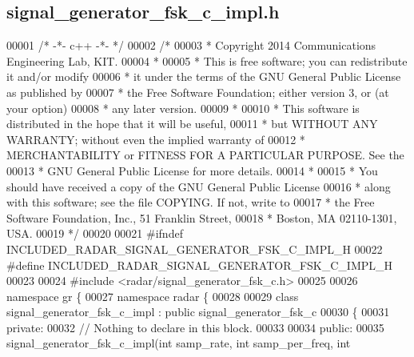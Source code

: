 \subsection{signal\+\_\+generator\+\_\+fsk\+\_\+c\+\_\+impl.\+h}
\label{signal__generator__fsk__c__impl_8h_source}

\begin{DoxyCode}
00001 \textcolor{comment}{/* -*- c++ -*- */}
00002 \textcolor{comment}{/* }
00003 \textcolor{comment}{ * Copyright 2014 Communications Engineering Lab, KIT.}
00004 \textcolor{comment}{ * }
00005 \textcolor{comment}{ * This is free software; you can redistribute it and/or modify}
00006 \textcolor{comment}{ * it under the terms of the GNU General Public License as published by}
00007 \textcolor{comment}{ * the Free Software Foundation; either version 3, or (at your option)}
00008 \textcolor{comment}{ * any later version.}
00009 \textcolor{comment}{ * }
00010 \textcolor{comment}{ * This software is distributed in the hope that it will be useful,}
00011 \textcolor{comment}{ * but WITHOUT ANY WARRANTY; without even the implied warranty of}
00012 \textcolor{comment}{ * MERCHANTABILITY or FITNESS FOR A PARTICULAR PURPOSE.  See the}
00013 \textcolor{comment}{ * GNU General Public License for more details.}
00014 \textcolor{comment}{ * }
00015 \textcolor{comment}{ * You should have received a copy of the GNU General Public License}
00016 \textcolor{comment}{ * along with this software; see the file COPYING.  If not, write to}
00017 \textcolor{comment}{ * the Free Software Foundation, Inc., 51 Franklin Street,}
00018 \textcolor{comment}{ * Boston, MA 02110-1301, USA.}
00019 \textcolor{comment}{ */}
00020  
00021 \textcolor{preprocessor}{#ifndef INCLUDED\_RADAR\_SIGNAL\_GENERATOR\_FSK\_C\_IMPL\_H}
00022 \textcolor{preprocessor}{#define INCLUDED\_RADAR\_SIGNAL\_GENERATOR\_FSK\_C\_IMPL\_H}
00023 
00024 \textcolor{preprocessor}{#include <radar/signal_generator_fsk_c.h>}
00025 
00026 \textcolor{keyword}{namespace }gr \{
00027   \textcolor{keyword}{namespace }radar \{
00028 
00029     \textcolor{keyword}{class }signal_generator_fsk_c_impl : \textcolor{keyword}{public} signal_generator_fsk_c
00030     \{
00031      \textcolor{keyword}{private}:
00032       \textcolor{comment}{// Nothing to declare in this block.}
00033 
00034      \textcolor{keyword}{public}:
00035       signal_generator_fsk_c_impl(\textcolor{keywordtype}{int} samp_rate, \textcolor{keywordtype}{int} samp_per_freq, \textcolor{keywordtype}{int} 

\end{DoxyCode}

